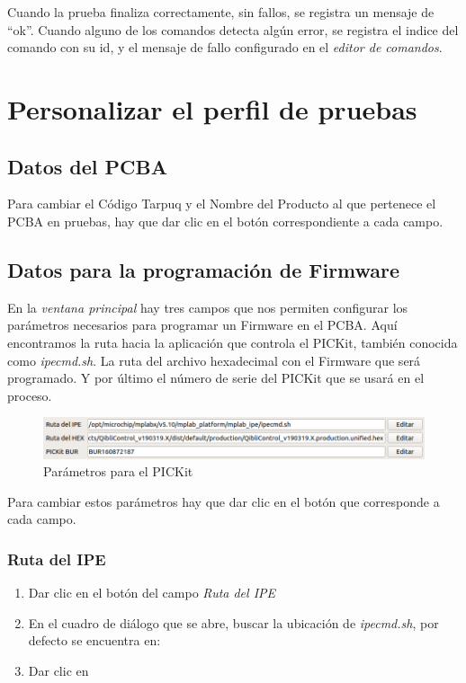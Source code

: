 \documentclass[a4paper,12pt]{refart}
\newcommand\commandEditor{\textit{editor de comandos}}
\begin{document}
Cuando la prueba finaliza correctamente, sin fallos, se registra un mensaje de ``ok''. Cuando alguno de los comandos detecta algún error, se registra el indice del comando con su id, y el mensaje de fallo configurado en el \commandEditor{}.

\section{Personalizar el perfil de pruebas}
\subsection{Datos del PCBA}
Para cambiar el Código Tarpuq y el Nombre del Producto al que pertenece el PCBA en pruebas, hay que dar clic en el botón  correspondiente a cada campo.

\subsection{Datos para la programación de Firmware}
En la \textit{ventana principal} hay tres campos que nos permiten configurar los parámetros necesarios para programar un Firmware en el PCBA. Aquí encontramos la ruta hacia la aplicación que controla el PICKit, también conocida como \emph{ipecmd.sh}. La ruta del archivo hexadecimal con el Firmware que será programado. Y por último el número de serie del PICKit que se usará en el proceso.

\begin{figure}[hbt!]\centering
\includegraphics[width=\textwidth, frame]{images/pickit_data} 
\caption{Parámetros para el PICKit}
\label{fig:pickitData}
\end{figure}

Para cambiar estos parámetros hay que dar clic en el botón  que corresponde a cada campo.

\subsubsection{Ruta del IPE}
\begin{enumerate}
\item Dar clic en el botón  del campo \emph{Ruta del IPE}
\item En el cuadro de diálogo que se abre, buscar la ubicación de \emph{ipecmd.sh}, por defecto se encuentra en: \\
\item Dar clic en 
\end{enumerate}
\end{document}

